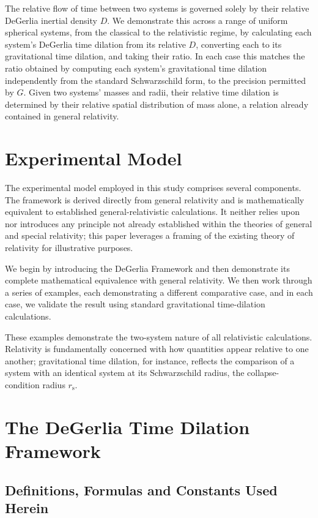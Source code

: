 \documentclass[twoside,twocolumn,9pt,fleqn]{article}
\begin{document}
The relative flow of time between two systems is governed solely by their relative DeGerlia inertial density\cite{degerlia202501} $D$. We demonstrate this across a range of uniform spherical systems, from the classical to the relativistic regime, by calculating each system’s DeGerlia time dilation from its relative $D$, converting each to its gravitational time dilation, and taking their ratio. In each case this matches the ratio obtained by computing each system’s gravitational time dilation independently from the standard Schwarzschild form, to the precision permitted by $G$. Given two systems’ masses and radii, their relative time dilation is determined by their relative spatial distribution of mass alone, a relation already contained in general relativity.

\section{Experimental Model}

The experimental model employed in this study comprises several components. The framework is derived directly from general relativity and is mathematically equivalent to established general-relativistic calculations. It neither relies upon nor introduces any principle not already established within the theories of general and special relativity; this paper leverages a framing of the existing theory of relativity for illustrative purposes.

We begin by introducing the DeGerlia Framework and then demonstrate its complete mathematical equivalence with general relativity. We then work through a series of examples, each demonstrating a different comparative case, and in each case, we validate the result using standard gravitational time-dilation calculations.

These examples demonstrate the two-system nature of all relativistic calculations. Relativity is fundamentally concerned with how quantities appear relative to one another; gravitational time dilation, for instance, reflects the comparison of a system with an identical system at its Schwarzschild radius, the collapse-condition radius $r_{\mathrm{s}}$.

\section{The DeGerlia Time Dilation Framework}

\subsection{Definitions, Formulas and Constants Used Herein}
\end{document}
